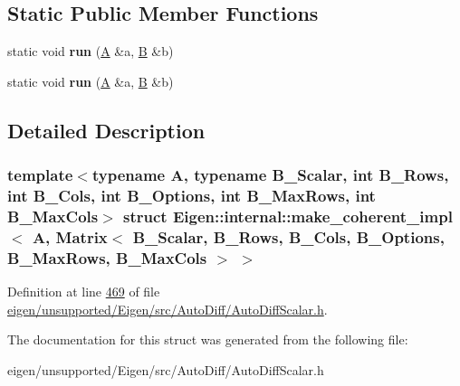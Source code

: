 \subsection*{Static Public Member Functions}
\begin{DoxyCompactItemize}
\item 
\mbox{\label{struct_eigen_1_1internal_1_1make__coherent__impl_3_01_a_00_01_matrix_3_01_b___scalar_00_01_b___r2332686f3180c2f2d848d1b5e8319450_ac5a19e6808140c2a38e071359aca9dcb}} 
static void {\bfseries run} (\hyperlink{group___core___module_class_eigen_1_1_matrix}{A} \&a, \hyperlink{group___core___module_class_eigen_1_1_matrix}{B} \&b)
\item 
\mbox{\label{struct_eigen_1_1internal_1_1make__coherent__impl_3_01_a_00_01_matrix_3_01_b___scalar_00_01_b___r2332686f3180c2f2d848d1b5e8319450_ac5a19e6808140c2a38e071359aca9dcb}} 
static void {\bfseries run} (\hyperlink{group___core___module_class_eigen_1_1_matrix}{A} \&a, \hyperlink{group___core___module_class_eigen_1_1_matrix}{B} \&b)
\end{DoxyCompactItemize}


\subsection{Detailed Description}
\subsubsection*{template$<$typename A, typename B\+\_\+\+Scalar, int B\+\_\+\+Rows, int B\+\_\+\+Cols, int B\+\_\+\+Options, int B\+\_\+\+Max\+Rows, int B\+\_\+\+Max\+Cols$>$\newline
struct Eigen\+::internal\+::make\+\_\+coherent\+\_\+impl$<$ A, Matrix$<$ B\+\_\+\+Scalar, B\+\_\+\+Rows, B\+\_\+\+Cols, B\+\_\+\+Options, B\+\_\+\+Max\+Rows, B\+\_\+\+Max\+Cols $>$ $>$}



Definition at line \hyperlink{eigen_2unsupported_2_eigen_2src_2_auto_diff_2_auto_diff_scalar_8h_source_l00469}{469} of file \hyperlink{eigen_2unsupported_2_eigen_2src_2_auto_diff_2_auto_diff_scalar_8h_source}{eigen/unsupported/\+Eigen/src/\+Auto\+Diff/\+Auto\+Diff\+Scalar.\+h}.



The documentation for this struct was generated from the following file\+:\begin{DoxyCompactItemize}
\item 
eigen/unsupported/\+Eigen/src/\+Auto\+Diff/\+Auto\+Diff\+Scalar.\+h\end{DoxyCompactItemize}
